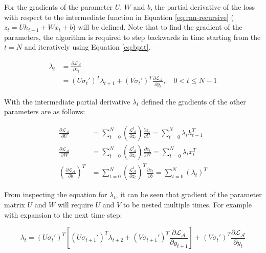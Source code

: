 For the gradients of the parameter $U$, $W$ and $b$, the partial derivative of the loss with respect to the intermediate function in Equation \ref{eq:rnn-recursive} ($z_t = Uh_{t-1} + Wx_t+b$) will be defined. Note that to find the gradient of the parameters, the algorithm is required to step backwards in time starting from the $t=N$ and iteratively using Equation \ref{eq:bptt}.

\begin{equation}
    \label{eq:bptt}
    \begin{split}
    \lambda_t &= \frac{\partial \mathcal{L}_\mathcal{A}}{\partial z_t}  \\
    &= (U\sigma_t')^T \lambda_{t+1} + (V \sigma_t')^T  \frac{\partial \mathcal{L}_\mathcal{A} }{\partial y_t}, \quad 0 < t \leq N - 1
    \end{split}
\end{equation}

With the intermediate partial derivative $\lambda_t$ defined the gradients of the other parameters are as follows:

\begin{equation}
    \begin{split}
        \frac{\partial \mathcal{L}_\mathcal{A}}{\partial U} &= \sum_{t=0}^{N}\left(\frac{\mathcal{L}_\mathcal{A}^t}{\partial z_t}\right) \frac{\partial z_t}{\partial U} = \sum_{t=0}^{N}\lambda_t h_{t-1}^T \\
        \frac{\partial \mathcal{L}_\mathcal{A}}{\partial W} &= \sum_{t=0}^{N}\left(\frac{\mathcal{L}_\mathcal{A}^t}{\partial z_t}\right) \frac{\partial z_t}{\partial W} = \sum_{t=0}^{N}\lambda_t x_{t}^T \\
        \left(\frac{\partial \mathcal{L}_\mathcal{A}}{\partial b}\right)^T &= \sum_{t=0}^{N}\left(\frac{\mathcal{L}_\mathcal{A}^t}{\partial z_t}\right)^T \frac{\partial z_t}{\partial b} = \sum_{t=0}^{N} (\lambda_t)^T
    \end{split}
\end{equation}

From inspecting the equation for $\lambda_t$, it can be seen that gradient of the parameter matrix $U$ and $W$ will require $U$ and $V$ to be nested multiple times. For example with expansion to the next time step: 

\begin{equation}
    \lambda_t = (U\sigma_t')^T \left[ (U\sigma_{t+1}')^T \lambda_{t+2} + (V \sigma_{t+1}')^T  \frac{\partial \mathcal{L}_\mathcal{A} }{\partial y_{t+1}} \right] + (V \sigma_t')^T  \frac{\partial \mathcal{L}_\mathcal{A} }{\partial y_t} 
\end{equation}

